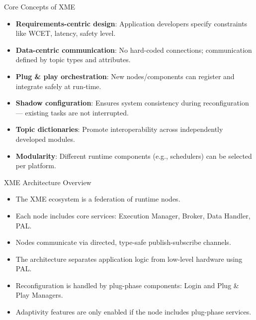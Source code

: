 \documentclass{beamer}
\begin{document}
\begin{frame}{Core Concepts of XME}
  \begin{itemize}
    \item \textbf{Requirements-centric design}: Application developers specify constraints like WCET, latency, safety level.
    \item \textbf{Data-centric communication}: No hard-coded connections; communication defined by topic types and attributes.
    \item \textbf{Plug \& play orchestration}: New nodes/components can register and integrate safely at run-time.
    \item \textbf{Shadow configuration}: Ensures system consistency during reconfiguration — existing tasks are not interrupted.
    \item \textbf{Topic dictionaries}: Promote interoperability across independently developed modules.
    \item \textbf{Modularity}: Different runtime components (e.g., schedulers) can be selected per platform.
  \end{itemize}
\end{frame}

\begin{frame}{XME Architecture Overview}
  \begin{itemize}
    \item The XME ecosystem is a federation of runtime nodes.
    \item Each node includes core services: Execution Manager, Broker, Data Handler, PAL.
    \item Nodes communicate via directed, type-safe publish-subscribe channels.
    \item The architecture separates application logic from low-level hardware using PAL.
    \item Reconfiguration is handled by plug-phase components: Login and Plug \& Play Managers.
    \item Adaptivity features are only enabled if the node includes plug-phase services.
  \end{itemize}
\end{frame}
\end{document}

